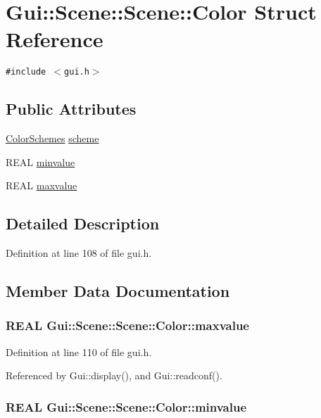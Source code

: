 \hypertarget{structGui_1_1Scene_1_1Color}{
\section{Gui::Scene::Scene::Color Struct Reference}
\label{structGui_1_1Scene_1_1Color}
}
{\tt \#include $<$gui.h$>$}

\subsection*{Public Attributes}
\begin{CompactItemize}
\item 
\hyperlink{namespaceGui_c2e79ad804d96d09cb5f4d6c4d790641}{ColorSchemes} \hyperlink{structGui_1_1Scene_1_1Color_46a11eecf40dfe7a3c9d9950cb59e522}{scheme}
\item 
REAL \hyperlink{structGui_1_1Scene_1_1Color_04ddb9c4b03841a69849a9ad385bb5d6}{minvalue}
\item 
REAL \hyperlink{structGui_1_1Scene_1_1Color_b891edd563e308968f840c9d376e5020}{maxvalue}
\end{CompactItemize}


\subsection{Detailed Description}


Definition at line 108 of file gui.h.

\subsection{Member Data Documentation}
\hypertarget{structGui_1_1Scene_1_1Color_b891edd563e308968f840c9d376e5020}{
\subsubsection[{maxvalue}]{\setlength{\rightskip}{0pt plus 5cm}REAL Gui::Scene::Scene::Color::maxvalue}}
\label{structGui_1_1Scene_1_1Color_b891edd563e308968f840c9d376e5020}




Definition at line 110 of file gui.h.

Referenced by Gui::display(), and Gui::readconf().\hypertarget{structGui_1_1Scene_1_1Color_04ddb9c4b03841a69849a9ad385bb5d6}{
\subsubsection[{minvalue}]{\setlength{\rightskip}{0pt plus 5cm}REAL Gui::Scene::Scene::Color::minvalue}}
\label{structGui_1_1Scene_1_1Color_04ddb9c4b03841a69849a9ad385bb5d6}




